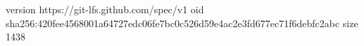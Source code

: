 version https://git-lfs.github.com/spec/v1
oid sha256:420fee4568001a64727edc06fe7bc0c526d59e4ac2e3fd677ec71f6debfc2abc
size 1438

